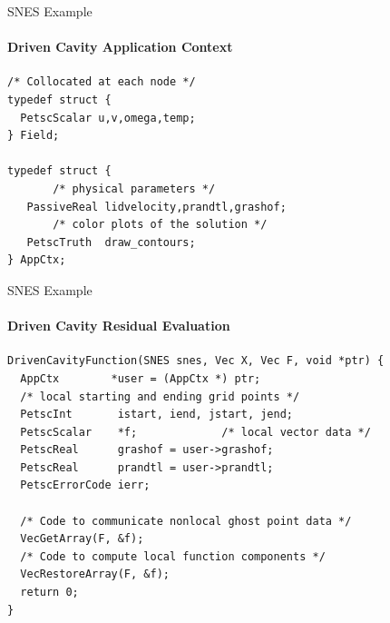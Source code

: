
\begin{frame}[fragile]{SNES Example}
\framesubtitle{Driven Cavity Application Context}
\begin{lstlisting}
/* Collocated at each node */
typedef struct {
  PetscScalar u,v,omega,temp;
} Field;

typedef struct {
       /* physical parameters */
   PassiveReal lidvelocity,prandtl,grashof;
       /* color plots of the solution */
   PetscTruth  draw_contours;
} AppCtx;
\end{lstlisting}
\end{frame}

\begin{frame}[fragile]{SNES Example}
\framesubtitle{Driven Cavity Residual Evaluation}
\small
\begin{lstlisting}
DrivenCavityFunction(SNES snes, Vec X, Vec F, void *ptr) {
  AppCtx        *user = (AppCtx *) ptr;
  /* local starting and ending grid points */
  PetscInt       istart, iend, jstart, jend;
  PetscScalar    *f;             /* local vector data */
  PetscReal      grashof = user->grashof;  
  PetscReal      prandtl = user->prandtl;
  PetscErrorCode ierr;

  /* Code to communicate nonlocal ghost point data */
  VecGetArray(F, &f);
  /* Code to compute local function components */
  VecRestoreArray(F, &f);
  return 0;
}
\end{lstlisting}
\end{frame}

